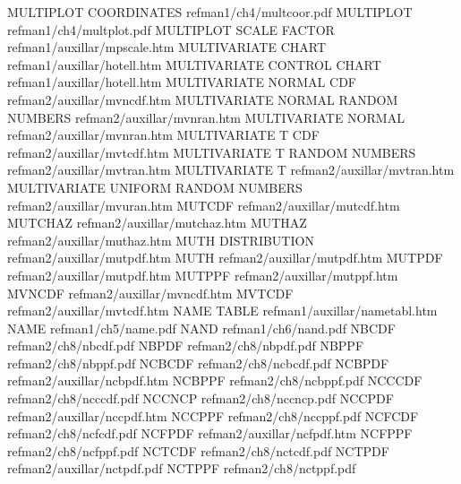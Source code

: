 MULTIPLOT COORDINATES                   refman1/ch4/multcoor.pdf
MULTIPLOT                               refman1/ch4/multplot.pdf
MULTIPLOT SCALE FACTOR                  refman1/auxillar/mpscale.htm
MULTIVARIATE CHART                      refman1/auxillar/hotell.htm
MULTIVARIATE CONTROL CHART              refman1/auxillar/hotell.htm
MULTIVARIATE NORMAL CDF                 refman2/auxillar/mvncdf.htm
MULTIVARIATE NORMAL RANDOM NUMBERS      refman2/auxillar/mvnran.htm
MULTIVARIATE NORMAL                     refman2/auxillar/mvnran.htm
MULTIVARIATE T CDF                      refman2/auxillar/mvtcdf.htm
MULTIVARIATE T RANDOM NUMBERS           refman2/auxillar/mvtran.htm
MULTIVARIATE T                          refman2/auxillar/mvtran.htm
MULTIVARIATE UNIFORM RANDOM NUMBERS     refman2/auxillar/mvuran.htm
MUTCDF                                  refman2/auxillar/mutcdf.htm
MUTCHAZ                                 refman2/auxillar/mutchaz.htm
MUTHAZ                                  refman2/auxillar/muthaz.htm
MUTH DISTRIBUTION                       refman2/auxillar/mutpdf.htm
MUTH                                    refman2/auxillar/mutpdf.htm
MUTPDF                                  refman2/auxillar/mutpdf.htm
MUTPPF                                  refman2/auxillar/mutppf.htm
MVNCDF                                  refman2/auxillar/mvncdf.htm
MVTCDF                                  refman2/auxillar/mvtcdf.htm
NAME TABLE                              refman1/auxillar/nametabl.htm
NAME                                    refman1/ch5/name.pdf
NAND                                    refman1/ch6/nand.pdf
NBCDF                                   refman2/ch8/nbcdf.pdf
NBPDF                                   refman2/ch8/nbpdf.pdf
NBPPF                                   refman2/ch8/nbppf.pdf
NCBCDF                                  refman2/ch8/ncbcdf.pdf
NCBPDF                                  refman2/auxillar/ncbpdf.htm
NCBPPF                                  refman2/ch8/ncbppf.pdf
NCCCDF                                  refman2/ch8/ncccdf.pdf
NCCNCP                                  refman2/ch8/nccncp.pdf
NCCPDF                                  refman2/auxillar/nccpdf.htm
NCCPPF                                  refman2/ch8/nccppf.pdf
NCFCDF                                  refman2/ch8/ncfcdf.pdf
NCFPDF                                  refman2/auxillar/ncfpdf.htm
NCFPPF                                  refman2/ch8/ncfppf.pdf
NCTCDF                                  refman2/ch8/nctcdf.pdf
NCTPDF                                  refman2/auxillar/nctpdf.pdf
NCTPPF                                  refman2/ch8/nctppf.pdf
